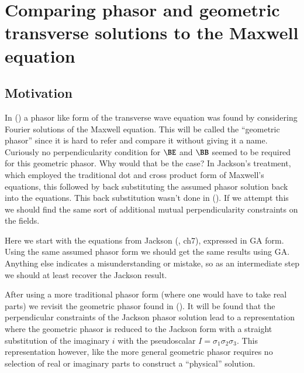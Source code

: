 %

\chapter{Comparing phasor and geometric transverse solutions to the Maxwell equation}
\label{chap:transverseWave}
{}
\date{August 6, 2009}

\beginArtWithToc

\section{Motivation}

In () a phasor like form of the transverse wave equation was found by considering Fourier solutions of the Maxwell equation.  This will be called the ``geometric phasor'' since it is hard to refer and compare it without giving it a name.  Curiously no perpendicularity condition for $\BE$ and $\BB$ seemed to be required for this geometric phasor.  Why would that be the case?  In Jackson's treatment, which employed the traditional dot and cross product form of Maxwell's equations, this followed by back substituting the assumed phasor solution back into the equations.  This back substitution wasn't done in ().  If we attempt this we should find the same sort of additional mutual perpendicularity constraints on the fields.

Here we start with the equations from Jackson (\citep{jackson1975cew}, ch7), expressed in GA form.  Using the same assumed phasor form we should get the same results using GA.  Anything else indicates a misunderstanding or mistake, so as an intermediate step we should at least recover the Jackson result.

After using a more traditional phasor form (where one would have to take real parts) we revisit the geometric phasor found in ().  It will be found that the perpendicular constraints of the Jackson phasor solution lead to a representation where the geometric phasor is reduced to the Jackson form with a straight substitution of the imaginary $i$ with the pseudoscalar $I = \sigma_1\sigma_2\sigma_3$.  This representation however, like the more general geometric phasor requires no selection of real or imaginary parts to construct a ``physical'' solution.

